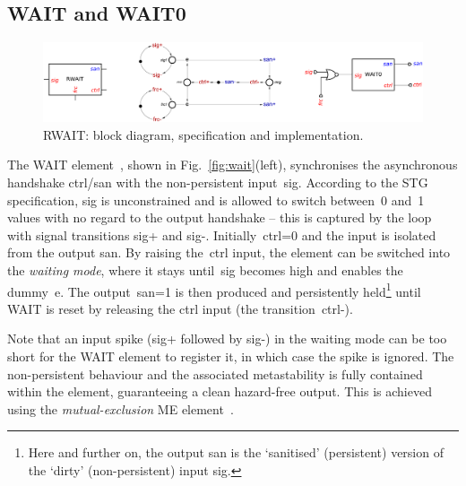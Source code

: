 \documentclass[conference]{IEEEtran}
\begin{document}
\subsection*{\textsf{WAIT} and \textsf{WAIT0}}

\begin{figure}
\begin{center}
    \includegraphics[scale=0.23]{fig/RWAIT.pdf}
    \vspace{-2.5mm}
    \caption{\textsf{RWAIT}: block diagram, specification and implementation.}
    \label{fig:rwait}
    \vspace{-8mm}
\end{center}
\end{figure}

The \textsf{WAIT} element~\cite{2015_sokolov_multiphase}, shown in Fig.~\ref{fig:wait}(left),
synchronises the asynchronous handshake \textsf{ctrl/san} with the non-persistent
input~\textsf{sig}. According to the STG specification, \textsf{sig} is unconstrained and
is allowed to switch between~0 and~1 values with no regard to the output handshake -- this
is captured by the loop with signal transitions \textsf{sig+} and \textsf{sig-}.
Initially~\textsf{ctrl=0} and the input is isolated from the output \textsf{san}.
By raising the~\textsf{ctrl} input, the element can be switched into the \emph{waiting mode},
where it stays until~\textsf{sig} becomes high and enables the
dummy~\textsf{e}. The output~\textsf{san=1} is then produced and persistently
held\footnote{Here and further on, the output \textsf{san}
is the `sanitised' (persistent) version of the `dirty' (non-persistent) input \textsf{sig}.}
until \textsf{WAIT} is reset by releasing the \textsf{ctrl} input (the transition~\textsf{ctrl-}).

Note that an input spike (\textsf{sig+} followed by \textsf{sig-}) in the waiting
mode can be too short for the \textsf{WAIT} element to register it, in which case the spike
is ignored. The non-persistent behaviour and the associated metastability is fully contained
within the element, guaranteeing a clean hazard-free output. This is achieved using the
\emph{mutual-exclusion} \textsf{ME} element~\cite{2008_kinniment_synchronisation}.
\end{document}
